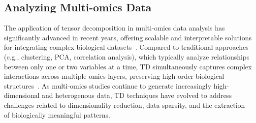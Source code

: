 \subsection{Analyzing Multi-omics Data}\label{sec:td_multiomics}


The application of tensor decomposition in multi-omics data analysis has significantly advanced in recent years, offering scalable and interpretable solutions for integrating complex biological datasets~\cite{hore2016tensor, amin2023tensor, lee2018gift, taguchi2022adapted, leistico2021epigenomic, taguchi2023tensor, wang2023probabilistic, tsuyuzaki2023sctensor, jung2021monti, taguchi2018tensor, fang2019tightly, taguchi2020tensor}. 
Compared to traditional approaches (e.g., clustering, PCA, correlation analysis), which typically analyze relationships between only one or two variables at a time, TD simultaneously captures complex interactions across multiple omics layers, preserving high-order biological structures~\cite{jung2021monti}. As multi-omics studies continue to generate increasingly high-dimensional and heterogenous data, TD techniques have evolved to address challenges related to dimensionality reduction, data sparsity, and the extraction of biologically meaningful patterns. 

